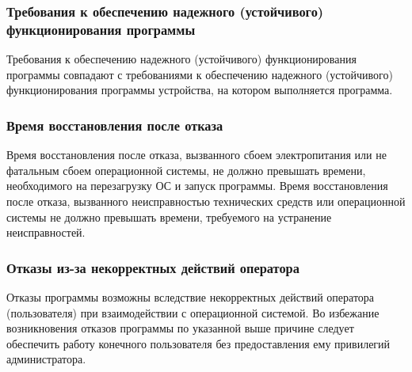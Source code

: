\subsubsection{Требования к обеспечению надежного (устойчивого) функционирования программы}
Требования к обеспечению надежного (устойчивого) функционирования программы совпадают с требованиями к обеспечению надежного (устойчивого) функционирования программы устройства, на котором выполняется программа.

\subsubsection{Время восстановления после отказа}
Время восстановления после отказа, вызванного сбоем электропитания или не фатальным сбоем операционной системы, не должно превышать времени, необходимого на перезагрузку ОС и запуск программы.
Время восстановления после отказа, вызванного неисправностью технических средств или операционной системы не должно превышать времени, требуемого на устранение неисправностей. 

\subsubsection{Отказы из-за некорректных действий оператора}
Отказы программы возможны вследствие некорректных действий оператора (пользователя) при взаимодействии с операционной системой. Во избежание возникновения отказов программы по указанной выше причине следует обеспечить работу конечного пользователя без предоставления ему привилегий администратора.
